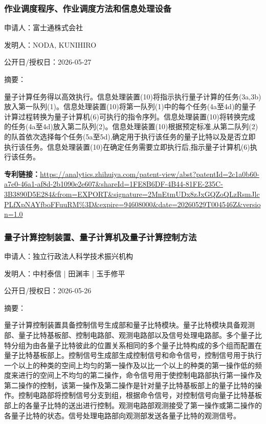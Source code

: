 \documentclass[12pt,a4paper]{ctexart}
\begin{document}
\subsubsection{ 作业调度程序、作业调度方法和信息处理设备 }

申请人：富士通株式会社

发明人：NODA, KUNIHIRO

公开日/授权日：2026-05-27

摘要：

量子计算任务得以高效执行。信息处理装置(10)将指示执行量子计算的任务(3a,3b)放入第一队列(1)。信息处理装置(10)将第一队列(1)中的每个任务(4a至4d)的量子计算过程转换为量子计算机(6)可执行的指令序列。信息处理装置(10)将转换完成的任务(4a至4d)放入第二队列(2)。信息处理装置(10)根据预定标准,从第二队列(2)的队首依次选择每个任务(5a至5d),确定用于执行该任务的量子比特以及是否立即执行该任务。信息处理装置(10)在确定任务需要立即执行后,指示量子计算机(6)执行该任务。

\noindent\textbf{专利链接：}\url{https://analytics.zhihuiya.com/patent-view/abst?patentId=2c1a0b60-a7e0-46a1-af8d-2b1090e2e607&shareId=1FE8B6DF-4B44-81FE-235C-3B3890D5E284&from=EXPORT&signature=2MnEtmUDx8zJxGQZoQLzRsmJlcPLfXpNAYfboFFuuRM%3D&expire=94608000&date=20260529T004546Z&version=1.0 }

\subsubsection{ 量子计算控制装置、量子计算机及量子计算控制方法 }

申请人：独立行政法人科学技术振兴机构

发明人：中村泰信 | 田渊丰 | 玉手修平

公开日/授权日：2026-05-26

摘要：

量子计算控制装置具备控制信号生成部和量子比特模块。量子比特模块具备观测部、量子比特基板部、控制电路部、观测电路部以及信号处理电路部。多个量子比特分组为由各量子比特彼此的位置关系相同的多个量子比特构成的多个组而配置在量子比特基板部上。控制信号生成部生成控制信号和命令信号，控制信号用于执行一个以上的种类的空间上均匀的第一操作及以比一个以上的种类的第一操作低的频度来进行的空间上不均匀的第二操作，命令信号用于使控制电路部执行第一操作及第二操作的控制，该第一操作及第二操作是针对量子比特基板部上的量子比特的操作。控制电路部将控制信号分支到组，根据命令信号，对控制信号向量子比特基板部上的各量子比特的送出进行控制。观测电路部观测接受了第一操作或第二操作的各量子比特的状态。信号处理电路部向观测部发送各量子比特的观测信号。
\end{document}
